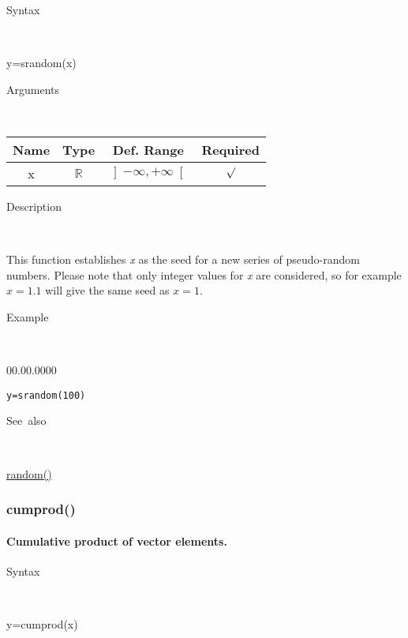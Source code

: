 \begin{description}
\item [Syntax]~
\end{description}
y=srandom(x)

\begin{description}
\item [Arguments]~
\end{description}
\begin{tabular}{|c|c|c|c|}
\hline 
Name&
Type&
Def. Range&
Required\tabularnewline
\hline
\hline 
x&
$\mathbb{R}$ &
$\left]-\infty,+\infty\right[$&
$\surd$\tabularnewline
\hline
\end{tabular}

\begin{description}
\item [Description]~
\end{description}
This function establishes \textit{x} as the seed for a new series of pseudo-random numbers.
Please note that only integer values for \textit{x} are considered, so for example $x=1.1$ will give the same seed as $x=1$.

\begin{description}
\item [Example]~
\end{description}
\begin{lyxlist}{00.00.0000}
\item [\texttt{y=srandom(100)}]
\end{lyxlist}
\begin{description}
\item [See~also]~
\end{description}
\textcolor{blue}{\hyperlink{random}{random()}}


\newpage
{}


\subsubsection*{\hypertarget{cumprod}{}{\Large cumprod()}}


\paragraph{\label{par:Cumulative-product}Cumulative product of vector elements.}

\begin{description}
\item [Syntax]~
\end{description}
y=cumprod(x)

